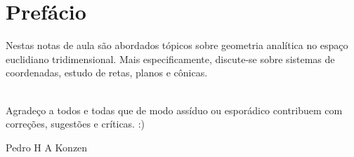 
\chapter*{Prefácio}\label{prefacio}

Nestas notas de aula são abordados tópicos sobre geometria analítica no espaço euclidiano tridimensional. Mais especificamente, discute-se sobre sistemas de coordenadas, estudo de retas, planos e cônicas.

~\\

Agradeço a todos e todas que de modo assíduo ou esporádico contribuem com correções, sugestões e críticas. :)

\begin{flushright}
  Pedro H A Konzen
\end{flushright}

